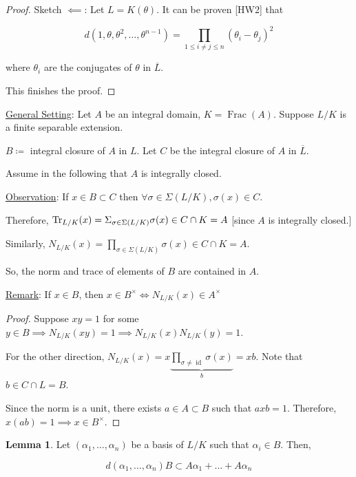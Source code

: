 \documentclass[openany]{amsbook}
\numberwithin{section}{chapter}
\theoremstyle{definition}
\newtheorem{lemma}[theorem]{Lemma}
\newcommand{\Frac}{\operatorname{Frac}}
\newcommand{\id}{\operatorname{id}}
\begin{document}
\begin{proof}
    Sketch \(\impliedby\): Let \(L = K(\theta)\). It can be proven [HW2] that
    
    \[
        d(1, \theta , \theta ^2, \dots , \theta^{n-1}) = \prod_{1 \leq i \neq j \leq n}^{} (\theta_i - \theta_j)^2
    \]
    
    where \(\theta_i\) are the conjugates of \(\theta\) in \(\overline{L}\).

    This finishes the proof.
\end{proof}

\underline{General Setting}: Let \(A\) be an integral domain, \(K = \Frac(A)\). Suppose \(L / K\) is a finite separable extension.

\(B \coloneqq \) integral closure of \(A\) in \(L\). Let \(C\) be the integral closure of \(A\) in \(\overline{L}\).

Assume in the following that \(A\) is integrally closed.

\underline{Observation}: If \(x\in B \subset C\) then \(\forall \sigma \in \Sigma (L / K), \sigma(x)\in C\).

Therefore, \(\Tr_{L / K}(x) = \Sigma_{\sigma \in \Sigma (L / K)} \sigma(x) \in C \cap K = A\) [since \(A\) is integrally closed.]

Similarly, \(N_{L / K}(x) = \prod_{\sigma \in \Sigma (L / K)}^{} \sigma (x) \in C\cap K = A\).

So, the norm and trace of elements of \(B\) are contained in \(A\). 

\underline{Remark}: If \(x\in B\), then \(x\in B^{\times} \iff N_{L / K} (x)\in A^\times\) 

\begin{proof}
    Suppose \(xy = 1\) for some \(y\in B \implies N_{L / K}(xy) = 1 \implies N_{L / K}(x) N_{L / K}(y) = 1\).

    For the other direction, \(N_{L / K}(x) = x \underbrace{\prod_{\sigma \neq \id}^{} \sigma(x)}_{b} = xb\). Note that \(b \in C \cap L = B\). 

    Since the norm is a unit, there exists \(a\in A \subset B\) such that \(axb = 1\). Therefore, \(x(ab) = 1 \implies x\in B^\times\).

\end{proof}

\begin{lemma}
    Let \((\alpha_1, \dots , \alpha_n)\) be a basis of \(L / K\) such that \(\alpha_i \in B\). Then,

    \[
        d(\alpha_1, \dots , \alpha_n) B \subset A \alpha_1 + \dots + A \alpha_n
    \]
\end{lemma}
\end{document}
